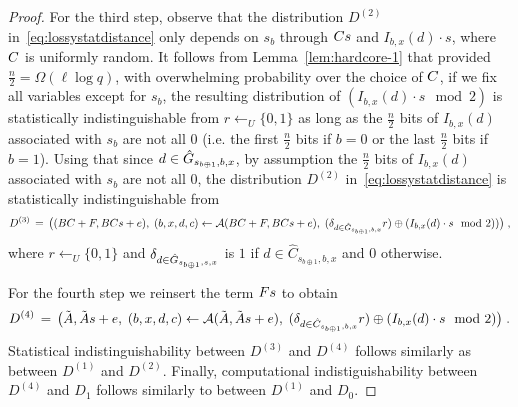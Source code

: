 \begin{proof}
For the third step, observe that the distribution ${D}^{(2)}$ in~\eqref{eq:lossystatdistance} only depends on $s_b$ through $\*C\*s$ and $I_{b,x}(d)\cdot s$, where $\*C$ is uniformly random. It follows from Lemma~\ref{lem:hardcore-1} that provided $\frac{n}{2}=\Omega(\ell\log q)$, with overwhelming probability over the choice of $\*C$, if we fix all variables except for $s_b$, the resulting distribution of $(I_{b,x}(d) \cdot s \mod 2)$ is statistically indistinguishable from $r\leftarrow_U \{0,1\}$ as long as the $\frac{n}{2}$ bits of  $I_{b,x}(d)$ associated with $s_b$ are not all $0$ (i.e. the first $\frac{n}{2}$ bits if $b = 0$ or the last $\frac{n}{2}$ bits if $b = 1$). Using that since $d\in \hat{G}_{s_{b\oplus 1},b,x}$, by assumption the $\frac{n}{2}$ bits of  $I_{b,x}(d)$ associated with $s_b$ are not all $0$,  the distribution 
 ${D}^{(2)}$ in~\eqref{eq:lossystatdistance} is statistically indistinguishable from 
\begin{eqnarray}\label{eq:distreplacewithr}
{D}^{(3)} \,=\,\big( (\*B\*C+\*F, \*B\*C\*s + \*e),\; (b,x,d,c)\leftarrow \mathcal{A}(\*B\*C + \*F,\*B\*C\*s + \*e),\; (\delta_{d\in \hat{\dset}_{s_{b\oplus 1},b,x}} r )\oplus (I_{b,x}(d)\cdot s\mod 2))\big)\;, 
\end{eqnarray}
where $r\leftarrow_U \{0,1\}$ and $\delta_{d\in \hat{G}_{s_{b\oplus 1},s,x}}$ is $1$ if $d\in \hat{C}_{s_{b\oplus 1},b,x}$ and $0$ otherwise. %


For the fourth step we reinsert the term $F\*s$ to obtain
\begin{eqnarray}\label{eq:distbacktolossy}
{D}^{(4)} \,=\, \big(\tilde{\*A}, \tilde{\*A}\*s + \*e,\; (b,x,d,c)\leftarrow \mathcal{A}(\tilde{\*A},\tilde{\*A}\*s + \*e),\; (\delta_{d\in \hat{C}_{s_{b\oplus 1},b,x}} r) \oplus (I_{b,x}(d) \cdot s\mod 2) \big)\;. 
\end{eqnarray}
Statistical indistinguishability between ${D}^{(3)}$ and ${D}^{(4)}$ follows similarly as between ${D}^{(1)}$ and ${D}^{(2)}$.
Finally, computational indistiguishability between ${D}^{(4)}$ and ${D}_1$ follows similarly to between ${D}^{(1)}$ and ${D}_0$.
\end{proof}




